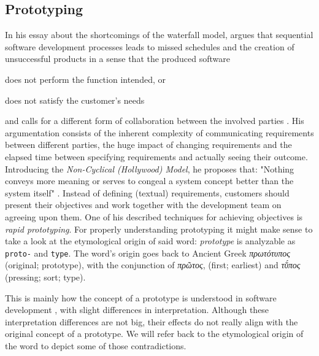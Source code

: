 \subsection{Prototyping}
In his essay  about the shortcomings of the waterfall model, \citeauthor{gladden_stop_1982} argues that sequential software development processes leads to missed schedules and the creation of unsuccessful products in a sense that the produced software \begin{enumerate*}[label=(\roman*)]
\item does not perform the function intended, or
\item does not satisfy the customer's needs
\end{enumerate*}
and calls for a different form of collaboration between the involved parties \cite{gladden_stop_1982}.
His argumentation consists of the inherent complexity of communicating requirements between different parties, the huge impact of changing requirements and the elapsed time between specifying requirements and actually seeing their outcome.
Introducing the \emph{Non-Cyclical (Hollywood) Model}, he proposes that: "Nothing conveys more meaning or serves to congeal a system concept better than the system itself" \cite{gladden_stop_1982}.
Instead of defining (textual) requirements, customers should present their objectives and work together with the development team on agreeing upon them.
One of his described techniques for achieving objectives is \emph{rapid prototyping}.
For properly understanding prototyping it might make sense to take a look at the etymological origin of said word: \emph{prototype} is analyzable as \texttt{proto-} and \texttt{type}.
The word's origin goes back to Ancient Greek \emph{\textgreek{πρωτότυπος}} (original; prototype), with the conjunction of \emph{\textgreek{πρῶτος}}, (first; earliest) and \emph{\textgreek{τῠ́πος}} (pressing; sort; type).

This is mainly how the concept of a prototype is understood in software development \cite{budde_what_1992}, with slight differences in interpretation.
Although these interpretation differences are not big, their effects do not really align with the original concept of a prototype.
We will refer back to the etymological origin of the word  to depict some of those contradictions.

